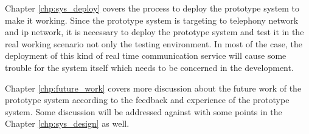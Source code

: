 \par Chapter \ref{chp:sys_deploy} covers the process to deploy the prototype system to make it working. Since the prototype system is targeting to telephony network and \gls{ip} network, it is necessary to deploy the prototype system and test it in the real working scenario not only the testing environment. In most of the case, the deployment of this kind of real time communication service will cause some trouble for the system itself which needs to be concerned in the development.

\par Chapter \ref{chp:future_work} covers more discussion about the future work of the prototype system according to the feedback and experience of the prototype system. Some discussion will be addressed against with some points in the Chapter \ref{chp:sys_design} as well.

